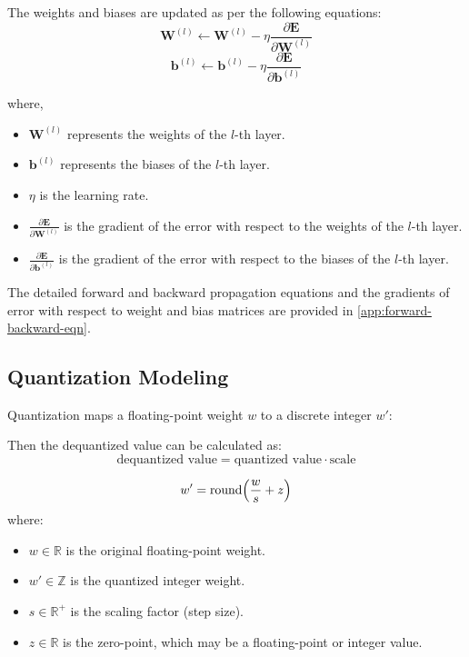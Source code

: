 The weights and biases are updated as per the following equations:
\begin{equation}
    \mathbf{W}^{(l)} \leftarrow \mathbf{W}^{(l)} - \eta \frac{\partial \mathbf{E}}{\partial \mathbf{W}^{(l)}}  
\end{equation}
\begin{equation}
    \mathbf{b}^{(l)} \leftarrow \mathbf{b}^{(l)} - \eta \frac{\partial \mathbf{E}}{\partial \mathbf{b}^{(l)}}  
\end{equation}

where,
\begin{itemize}
    \item \( \mathbf{W}^{(l)} \) represents the weights of the \( l \)-th layer.
    \item \( \mathbf{b}^{(l)} \) represents the biases of the \( l \)-th layer.
    \item \( \eta \) is the learning rate.
    \item \( \frac{\partial \mathbf{E}}{\partial \mathbf{W}^{(l)}} \) is the gradient of the error with respect to the weights of the \( l \)-th layer.
    \item \( \frac{\partial \mathbf{E}}{\partial \mathbf{b}^{(l)}} \) is the gradient of the error with respect to the biases of the \( l \)-th layer.
\end{itemize}

The detailed forward and backward propagation equations and the gradients of error with respect to weight and bias matrices are provided in \autoref{app:forward-backward-eqn}.


\subsection{Quantization Modeling}
Quantization maps a floating-point weight \( w \) to a discrete integer \( w' \):


Then the dequantized value can be calculated as:
\begin{equation}
\text{dequantized value} = \text{quantized value} \cdot \text{scale}
\end{equation}



\begin{equation}
w' = \text{round}\Bigl(\frac{w}{s} + z\Bigr)
\label{eq:quantization_mapping}
\end{equation}
where:
\begin{itemize}
    \item \( w \in \mathbb{R} \) is the original floating-point weight.
    \item \( w' \in \mathbb{Z} \) is the quantized integer weight.
    \item \( s \in \mathbb{R}^+ \) is the scaling factor (step size).
    \item \( z \in \mathbb{R} \) is the zero-point, which may be a floating-point or integer value.
\end{itemize}

